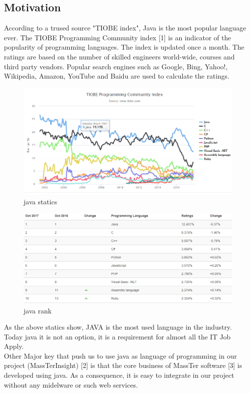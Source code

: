 \documentclass[12pt]{article}
\begin{document}
\subsection{Motivation}
According to a trused source "TIOBE index", Java is the most popular language ever.
The TIOBE Programming Community index [1] is an indicator of the popularity of programming languages. The index is updated once a month. The ratings are based on the number of skilled engineers world-wide, courses and third party vendors. Popular search engines such as Google, Bing, Yahoo!, Wikipedia, Amazon, YouTube and Baidu are used to calculate the ratings.
	\begin{figure}[h]
	\centering
	\includegraphics[width=1.0\textwidth]{Java_statics.png}
	\caption{java statics}
    \end{figure}
	\begin{figure}[h]
	\centering
	\includegraphics[width=1.0\textwidth]{Java_rank.png}
	\caption{java rank}
    \end{figure}
 As the above statics show, JAVA is the most used language in the industry. Today java it is not an option, it is a requirement for almost all the IT Job Apply. \\Other Major key that push us to use java as language of programming in our project (MassTerInsight) [2] is that the core business of MassTer software [3] is developed using java. As a consequence, it is easy to integrate in our project without any midelware or such web services.
 
\end{document}
